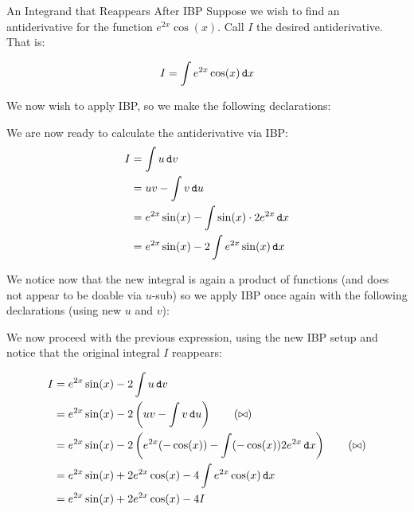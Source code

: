 \begin{example}{An Integrand that Reappears After IBP}
Suppose we wish to find an antiderivative for the function $e^{2x}\cos(x)$.  Call $I$ the desired antiderivative.  That is:

$$ I=\int e^{2x}\cos(x) \mathop{}\!\mathtt{d} x$$ 

We now wish to apply IBP, so we make the following declarations:

We are now ready to calculate the antiderivative via IBP:
\begin{align*} I &= \int u \mathop{}\!\mathtt{d} v \\
&= uv-\int v \mathop{}\!\mathtt{d} u \\ 
&= e^{2x}\sin(x) - \int \sin(x) \cdot 2e^{2x} \mathop{}\!\mathtt{d} x \\
&= e^{2x}\sin(x) -2 \int e^{2x}\sin(x) \mathop{}\!\mathtt{d} x \\
\end{align*}

We notice now that the new integral is again a product of functions (and does not appear to be doable via $u$-sub) so we apply IBP once again with the following declarations (using new $u$ and $v$):

We now proceed with the previous expression, using the new IBP setup and notice that the original integral $I$ reappears:

\begin{align*} I &= e^{2x}\sin(x) -2 \int u \mathop{}\!\mathtt{d} v \\
&=e^{2x}\sin(x) -2 \left( uv-\int v \mathop{}\!\mathtt{d} u \right) \tag{$\bowtie$} \\
&=e^{2x}\sin(x) -2 \left( e^{2x}(-\cos(x))-\int (-\cos(x))2e^{2x} \mathop{}\!\mathtt{d} x \right) \tag{$\bowtie$} \\
&=e^{2x}\sin(x) +2e^{2x}\cos(x)-4\int e^{2x}\cos(x) \mathop{}\!\mathtt{d} x \\
&=e^{2x}\sin(x) +2e^{2x}\cos(x)-4I
\end{align*}


\end{example}
